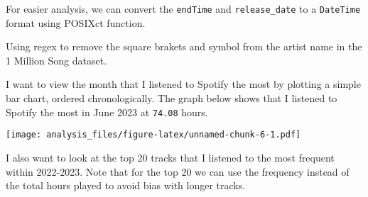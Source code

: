 \documentclass[
]{article}
\newenvironment{Shaded}{\begin{snugshade}}{\end{snugshade}}
\newcommand{\AttributeTok}[1]{\textcolor[rgb]{0.13,0.29,0.53}{#1}}
\newcommand{\CommentTok}[1]{\textcolor[rgb]{0.56,0.35,0.01}{\textit{#1}}}
\newcommand{\FunctionTok}[1]{\textcolor[rgb]{0.13,0.29,0.53}{\textbf{#1}}}
\newcommand{\NormalTok}[1]{#1}
\newcommand{\OtherTok}[1]{\textcolor[rgb]{0.56,0.35,0.01}{#1}}
\newcommand{\SpecialCharTok}[1]{\textcolor[rgb]{0.81,0.36,0.00}{\textbf{#1}}}
\newcommand{\StringTok}[1]{\textcolor[rgb]{0.31,0.60,0.02}{#1}}
\begin{document}
For easier analysis, we can convert the \texttt{endTime} and
\texttt{release\_date} to a \texttt{DateTime} format using POSIXct
function.

\begin{Shaded}
\end{Shaded}

Using regex to remove the square brakets and \texttt{\textquotesingle{}}
symbol from the artist name in the 1 Million Song dataset.

\begin{Shaded}
\end{Shaded}

I want to view the month that I listened to Spotify the most by plotting
a simple bar chart, ordered chronologically. The graph below shows that
I listened to Spotify the most in June 2023 at \texttt{74.08} hours.

\texttt{[image: analysis\_files/figure-latex/unnamed-chunk-6-1.pdf]}

I also want to look at the top 20 tracks that I listened to the most
frequent within 2022-2023. Note that for the top 20 we can use the
frequency instead of the total hours played to avoid bias with longer
tracks.
\end{document}
